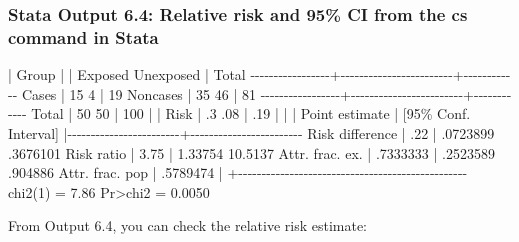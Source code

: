 \documentclass[
]{memoir}
\newenvironment{Shaded}{\begin{snugshade}}{\end{snugshade}}
\newcommand{\NormalTok}[1]{#1}
\begin{document}
\hypertarget{stata-output-6.4-relative-risk-and-95-ci-from-the-cs-command-in-stata}{%
\subsubsection*{Stata Output 6.4: Relative risk and 95\% CI from the cs command in Stata}\label{stata-output-6.4-relative-risk-and-95-ci-from-the-cs-command-in-stata}}

\begin{Shaded}
\begin{Highlighting}[]
\NormalTok{                 | Group                  |}
\NormalTok{                 |   Exposed   Unexposed  |      Total}
\NormalTok{{-}{-}{-}{-}{-}{-}{-}{-}{-}{-}{-}{-}{-}{-}{-}{-}{-}+{-}{-}{-}{-}{-}{-}{-}{-}{-}{-}{-}{-}{-}{-}{-}{-}{-}{-}{-}{-}{-}{-}{-}{-}+{-}{-}{-}{-}{-}{-}{-}{-}{-}{-}{-}{-}}
\NormalTok{           Cases |        15           4  |         19}
\NormalTok{        Noncases |        35          46  |         81}
\NormalTok{{-}{-}{-}{-}{-}{-}{-}{-}{-}{-}{-}{-}{-}{-}{-}{-}{-}+{-}{-}{-}{-}{-}{-}{-}{-}{-}{-}{-}{-}{-}{-}{-}{-}{-}{-}{-}{-}{-}{-}{-}{-}+{-}{-}{-}{-}{-}{-}{-}{-}{-}{-}{-}{-}}
\NormalTok{           Total |        50          50  |        100}
\NormalTok{                 |                        |}
\NormalTok{            Risk |        .3         .08  |        .19}
\NormalTok{                 |                        |}
\NormalTok{                 |      Point estimate    |    [95\% Conf. Interval]}
\NormalTok{                 |{-}{-}{-}{-}{-}{-}{-}{-}{-}{-}{-}{-}{-}{-}{-}{-}{-}{-}{-}{-}{-}{-}{-}{-}+{-}{-}{-}{-}{-}{-}{-}{-}{-}{-}{-}{-}{-}{-}{-}{-}{-}{-}{-}{-}{-}{-}{-}{-}}
\NormalTok{ Risk difference |              .22       |    .0723899    .3676101 }
\NormalTok{      Risk ratio |             3.75       |     1.33754     10.5137 }
\NormalTok{ Attr. frac. ex. |         .7333333       |    .2523589     .904886 }
\NormalTok{ Attr. frac. pop |         .5789474       |}
\NormalTok{                 +{-}{-}{-}{-}{-}{-}{-}{-}{-}{-}{-}{-}{-}{-}{-}{-}{-}{-}{-}{-}{-}{-}{-}{-}{-}{-}{-}{-}{-}{-}{-}{-}{-}{-}{-}{-}{-}{-}{-}{-}{-}{-}{-}{-}{-}{-}{-}{-}{-}}
\NormalTok{                               chi2(1) =     7.86  Pr\textgreater{}chi2 = 0.0050}
\end{Highlighting}
\end{Shaded}

From Output 6.4, you can check the relative risk estimate:
\end{document}
